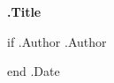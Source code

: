\begin{titlepage}
\centering
\vspace*{2cm}

{\Huge\bfseries {{.Title}}}

\vspace{1cm}
{{if .Author}}
{\Large {{.Author}}}

\vspace{1cm}
{{end}}
{\large {{.Date}}}

\vfill
\end{titlepage}